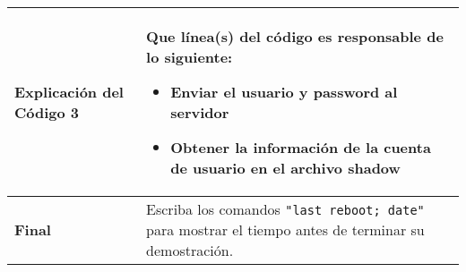 \begin{longtable}{|p{}|p{}|}
 \textbf{Explicación del Código 3} & 
	Que línea(s) del código es responsable de lo siguiente:
	\vspace*{0.2cm}
 	\begin{itemize}[topsep=-0.5cm,leftmargin=0.4cm]
 		\item Enviar el usuario y password al servidor
 		\item Obtener la información de la cuenta de usuario en el archivo shadow
	\end{itemize}
 \\ 
 \hline

 \textbf{Final} & 
	Escriba los comandos \texttt{"last reboot; date"} para mostrar el tiempo antes de terminar su demostración.
 \\ 
 \hline

\end{longtable}
